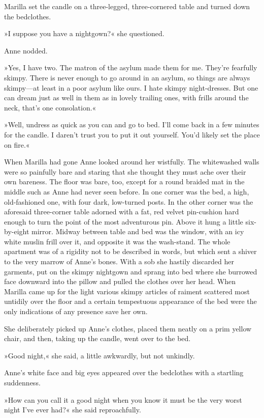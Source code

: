 Marilla set the candle on a three-legged, three-cornered table and turned down the bedclothes.

»I suppose you have a nightgown?« she questioned.

Anne nodded.

»Yes, I have two. The matron of the asylum made them for me. They're fearfully skimpy. There is never enough to go around in an asylum, so things are always skimpy—at least in a poor asylum like ours. I hate skimpy night-dresses. But one can dream just as well in them as in lovely trailing ones, with frills around the neck, that's one consolation.«

»Well, undress as quick as you can and go to bed. I'll come back in a few minutes for the candle. I daren't trust you to put it out yourself. You'd likely set the place on fire.«

When Marilla had gone Anne looked around her wistfully. The whitewashed walls were so painfully bare and staring that she thought they must ache over their own bareness. The floor was bare, too, except for a round braided mat in the middle such as Anne had never seen before. In one corner was the bed, a high, old-fashioned one, with four dark, low-turned posts. In the other corner was the aforesaid three-corner table adorned with a fat, red velvet pin-cushion hard enough to turn the point of the most adventurous pin. Above it hung a little six-by-eight mirror. Midway between table and bed was the window, with an icy white muslin frill over it, and opposite it was the wash-stand. The whole apartment was of a rigidity not to be described in words, but which sent a shiver to the very marrow of Anne's bones. With a sob she hastily discarded her garments, put on the skimpy nightgown and sprang into bed where she burrowed face downward into the pillow and pulled the clothes over her head. When Marilla came up for the light various skimpy articles of raiment scattered most untidily over the floor and a certain tempestuous appearance of the bed were the only indications of any presence save her own.

She deliberately picked up Anne's clothes, placed them neatly on a prim yellow chair, and then, taking up the candle, went over to the bed.

»Good night,« she said, a little awkwardly, but not unkindly.

Anne's white face and big eyes appeared over the bedclothes with a startling suddenness.

»How can you call it a good night when you know it must be the very worst night I've ever had?« she said reproachfully.


